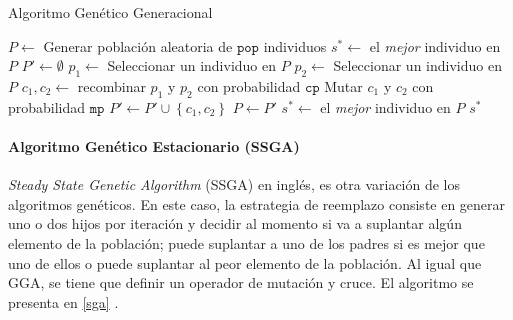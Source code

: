 \begin{algorithm}
\caption{Algoritmo Genético Generacional}
\label{gga}
\begin{algorithmic}[1]


\State $P \gets$ Generar población aleatoria de $\texttt{pop}$ individuos
\State $s^* \gets $ el \emph{mejor} individuo en $P$
	\State $P' \gets \emptyset$
		\State $p_1 \gets$ Seleccionar un individuo en $P$
		\State $p_2 \gets$ Seleccionar un individuo en $P$
		\State $c_1, c_2 \gets $ recombinar $p_1$ y $p_2$ con probabilidad $\texttt{cp}$
		\State Mutar $c_1$ y $c_2$ con probabilidad $\texttt{mp}$
		\State $P' \gets P' \cup \left\lbrace c_1, c_2 \right\rbrace$
	\EndWhile
	\State $P \gets P'$
		\State $s^* \gets$ el \emph{mejor} individuo en $P$
	\EndIf
\EndWhile
\State \Return $s^*$

\end{algorithmic}
\end{algorithm}

\paragraph{Algoritmo Genético Estacionario (SSGA)}

\emph{Steady State Genetic Algorithm} (SSGA) en inglés, es otra variación de los algoritmos genéticos. En este caso, la estrategia de reemplazo consiste en generar uno o dos hijos por iteración y decidir al momento si va a suplantar algún elemento de la población; puede suplantar a uno de los padres si es mejor que uno de ellos o puede suplantar al peor elemento de la población. Al igual que GGA, se tiene que definir un operador de mutación y cruce. El algoritmo se presenta en \ref{sga} \cite{flores2014metaheuristics}.

